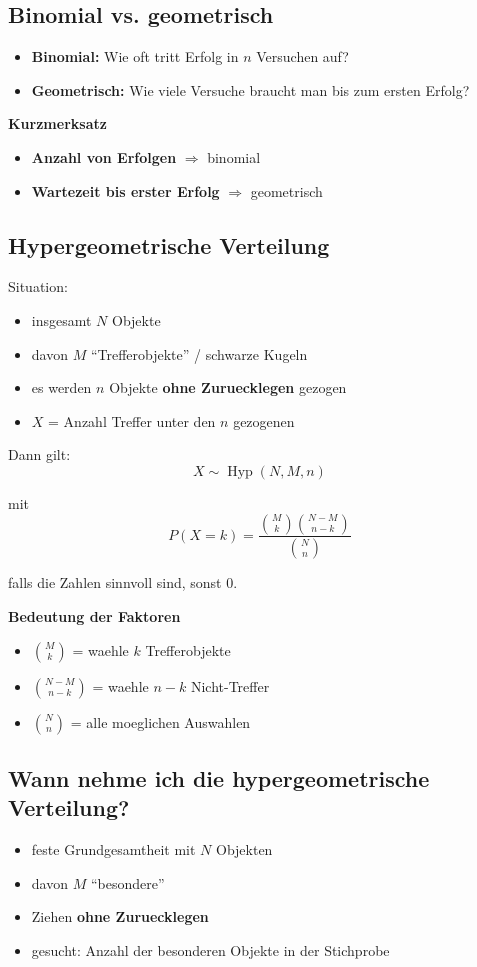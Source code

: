 \documentclass[a4paper,11pt]{article}
\begin{document}
\subsection{Binomial vs. geometrisch}
\begin{itemize}
  \item \textbf{Binomial:} Wie oft tritt Erfolg in $n$ Versuchen auf?
  \item \textbf{Geometrisch:} Wie viele Versuche braucht man bis zum ersten Erfolg?
\end{itemize}

\textbf{Kurzmerksatz}
\begin{itemize}
  \item \textbf{Anzahl von Erfolgen} $\Rightarrow$ binomial
  \item \textbf{Wartezeit bis erster Erfolg} $\Rightarrow$ geometrisch
\end{itemize}

\subsection{Hypergeometrische Verteilung}
Situation:
\begin{itemize}
  \item insgesamt $N$ Objekte
  \item davon $M$ ``Trefferobjekte'' / schwarze Kugeln
  \item es werden $n$ Objekte \textbf{ohne Zuruecklegen} gezogen
  \item $X$ = Anzahl Treffer unter den $n$ gezogenen
\end{itemize}

Dann gilt:
\[
X \sim \operatorname{Hyp}(N,M,n)
\]

mit
\[
P(X=k)=\frac{\binom{M}{k}\binom{N-M}{n-k}}{\binom{N}{n}}
\]

falls die Zahlen sinnvoll sind, sonst $0$.

\textbf{Bedeutung der Faktoren}
\begin{itemize}
  \item $\binom{M}{k}$ = waehle $k$ Trefferobjekte
  \item $\binom{N-M}{n-k}$ = waehle $n-k$ Nicht-Treffer
  \item $\binom{N}{n}$ = alle moeglichen Auswahlen
\end{itemize}

\subsection{Wann nehme ich die hypergeometrische Verteilung?}
\begin{itemize}
  \item feste Grundgesamtheit mit $N$ Objekten
  \item davon $M$ ``besondere''
  \item Ziehen \textbf{ohne Zuruecklegen}
  \item gesucht: Anzahl der besonderen Objekte in der Stichprobe
\end{itemize}
\end{document}
